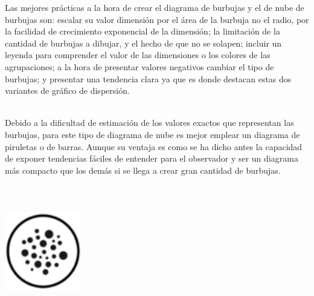 \documentclass{article}\usepackage[]{graphicx}\usepackage[]{color}
\begin{document}
Las mejores pr\'acticas a la hora de crear el diagrama de burbujas y el de nube de burbujas son: escalar su valor dimensi\'on por el \'area de la burbuja no el radio, por la facilidad de crecimiento exponencial de la dimensi\'on; la limitaci\'on de la cantidad de burbujas a dibujar, y el hecho de que no se solapen; incluir un leyenda para comprender el valor de las dimensiones o los colores de las agrupaciones; a la hora de presentar valores negativos cambiar el tipo de burbujas; y presentar una tendencia clara ya que es donde destacan estas dos variantes de gr\'afico de dispersi\'on\cite{chart-bubble}.~\\~\par
Debido a la dificultad de estimaci\'on de los valores exactos que representan las burbujas, para este tipo de diagrama de nube es mejor emplear un diagrama de piruletas o de barras. Aunque su ventaja es como se ha dicho antes la capacidad de exponer tendencias f\'aciles de entender para el observador y ser un diagrama m\'as compacto que los dem\'as si se llega a crear gran cantidad de burbujas.
~\\~\\~\\~\\
\vbox{
    \centering
    \includegraphics[width=0.25\textwidth]{imag/bubbles}
}
\clearpage
\end{document}
